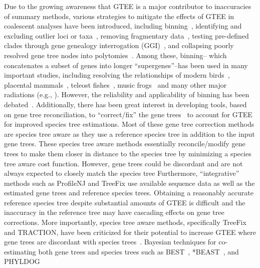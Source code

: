 \documentclass[10pt,a4paper]{article}
\begin{document}
Due to the growing awareness that GTEE is a major contributor to inaccuracies of summary methods, various strategies to mitigate the effects of GTEE in coalescent analyses have been introduced, including  binning~\cite{bayzid2013naive,statistical-binning,bayzid2015weighted}, identifying and excluding outlier loci or taxa~\cite{wickett2014phylotranscriptomic,1kp}, removing fragmentary data~\cite{sayyari2017fragmentary}, testing pre-defined clades through gene genealogy interrogation (GGI)~\cite{arcila2017genome}, and collapsing poorly resolved gene tree nodes into polytomies~\cite{zhang2018astral}. Among these, binning-- which concatenates a subset of genes into longer ``supergenes''--has been used in many important studies, including resolving the relationships of modern birds~\cite{jarvis2014}, placental mammals~\cite{tarver-placentalmammal-2016}, teleost fishes~\cite{malmstrom2016fishes}, music frogs~\cite{lyu2024frogs} and many other major radiations (e.g., \cite{blaimer2016phylogenomics,branstetter2017phylogenomic,jevsovnik2017phylogenomic,platt2018bats}). However, the reliability and applicability of binning has been debated~\cite{streicher2018evaluating,adams2019statisticalbinning}. Additionally, there has been great interest in developing tools, based on gene tree reconciliation, to ``correct/fix'' the gene trees~\cite{notung,treefix,rasmussen2011bayesian,traction,profilenj,tt,treefix-dtl-bansal2015improved,nguyen2012accounting,jacox2017resolution,lafond2017gene} to account for GTEE for improved species tree estimations.
Most of these gene tree correction methods are species tree aware as they use a reference species tree in addition to the input gene trees. These species tree aware  methods essentially reconcile/modify gene trees to make them closer in distance to the species tree by minimizing a species tree aware cost function. However, gene trees could be discordant and are not always expected to closely match the species tree %
Furthermore, ``integrative'' methods such as ProfileNJ and TreeFix use available sequence data as well as the estimated gene trees and reference species trees. Obtaining a reasonably accurate reference species tree despite substantial amounts of GTEE is difficult and the inaccuracy in the reference tree may have cascading effects on gene tree corrections. More importantly, species tree aware methods, specifically TreeFix and TRACTION, have been criticized for their potential to increase GTEE where gene trees are discordant with species trees~\cite{zhiyan}. Bayesian techniques for co-estimating both gene trees and species trees such as BEST~\cite{best}, *BEAST~\cite{heled-drummond}, and PHYLDOG~\cite{boussau2013genome} 
\end{document}
